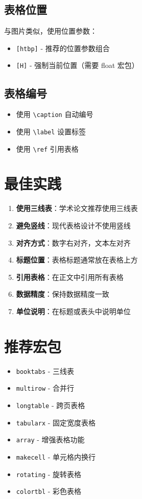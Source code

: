 \subsection{表格位置}

与图片类似，使用位置参数：
\begin{itemize}
  \item \texttt{[htbp]} - 推荐的位置参数组合
  \item \texttt{[H]} - 强制当前位置（需要 float 宏包）
\end{itemize}

\subsection{表格编号}

\begin{itemize}
  \item 使用 \texttt{\textbackslash caption} 自动编号
  \item 使用 \texttt{\textbackslash label} 设置标签
  \item 使用 \texttt{\textbackslash ref} 引用表格
\end{itemize}

\section{最佳实践}

\begin{enumerate}
  \item \textbf{使用三线表}：学术论文推荐使用三线表
  \item \textbf{避免竖线}：现代表格设计不使用竖线
  \item \textbf{对齐方式}：数字右对齐，文本左对齐
  \item \textbf{标题位置}：表格标题通常放在表格上方
  \item \textbf{引用表格}：在正文中引用所有表格
  \item \textbf{数据精度}：保持数据精度一致
  \item \textbf{单位说明}：在标题或表头中说明单位
\end{enumerate}

\section{推荐宏包}

\begin{itemize}
  \item \texttt{booktabs} - 三线表
  \item \texttt{multirow} - 合并行
  \item \texttt{longtable} - 跨页表格
  \item \texttt{tabularx} - 固定宽度表格
  \item \texttt{array} - 增强表格功能
  \item \texttt{makecell} - 单元格内换行
  \item \texttt{rotating} - 旋转表格
  \item \texttt{colortbl} - 彩色表格
\end{itemize}
